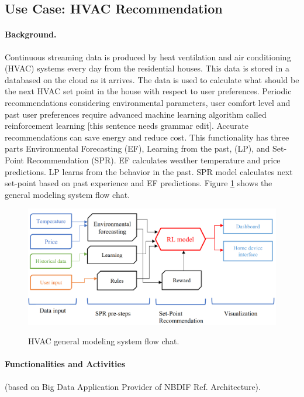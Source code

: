 \subsection{Use Case: HVAC Recommendation}


\paragraph*{Background.}

Continuous streaming data is produced by heat ventilation and air conditioning (HVAC) systems every
day from the residential houses. This data is stored in a databased on the cloud as it arrives. The data
is used to calculate what should be the next HVAC set point in the house with respect to user
preferences. Periodic recommendations considering environmental parameters, user comfort level
and past user preferences require advanced machine learning algorithm called reinforcement
learning [this sentence needs grammar edit]. Accurate recommendations can save energy and reduce cost. This functionality has three
parts Environmental Forecasting (EF), Learning from the past, (LP), and Set-Point Recommendation
(SPR). EF calculates weather temperature and price predictions. LP learns from the behavior in the
past. SPR model calculates next set-point based on past experience and EF predictions. Figure \ref{fig:hvac-1} shows
the general modeling system flow chat.

\begin{figure}[htb]
\includegraphics[width=1.0\textwidth]{usecase/hvac.png}
\label{fig:hvac-1}
\caption{HVAC general modeling system flow chat.}
\end{figure}


\paragraph*{Functionalities and Activities} (based on Big Data Application Provider of NBDIF Ref. Architecture).



